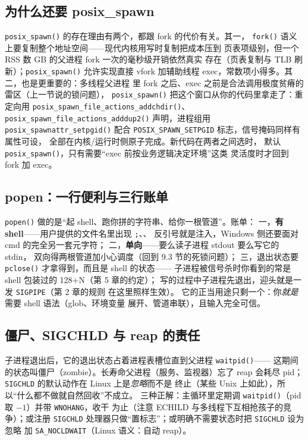 \documentclass[12pt,a4paper,fontset=fandol]{ctexbook}
\newcommand{\Fn}[1]{\texttt{#1()}}
\newcommand{\Tp}[1]{\texttt{#1}}
\begin{document}
\subsection{为什么还要 posix\_spawn}

\Fn{posix\_spawn} 的存在理由有两个，都跟 fork 的代价有关。其一，
\Fn{fork} 语义上要复制整个地址空间——现代内核用写时复制把成本压到
页表项级别，但一个 RSS 数 GB 的父进程 fork 一次的毫秒级开销依然真实
存在（页表复制与 TLB 刷新）；\Fn{posix\_spawn} 允许实现直接
vfork 加辅助线程 exec，常数项小得多。其二，也是更重要的：多线程父进程
里 fork 之后、exec 之前是合法调用极度贫瘠的雷区（上一节说的锁问题），
\Fn{posix\_spawn} 把这个窗口从你的代码里拿走了：重定向用
\Fn{posix\_\-spawn\_\-file\_\-actions\_\-addchdir}、
\Fn{posix\_\-spawn\_\-file\_\-actions\_\-adddup2} 声明，进程组用
\Fn{posix\_\-spawnattr\_\-setpgid} 配合
\Tp{POSIX\_\-SPAWN\_\-SETPGID} 标志，信号掩码同样有属性可设，
全部在内核/运行时侧原子完成。新代码在两者之间选时，
默认 \Fn{posix\_spawn}，只有需要``exec 前按业务逻辑决定环境''这类
灵活度时才回到 fork 加 exec。

\subsection{popen：一行便利与三行账单}

\Fn{popen} 做的是``起 shell、跑你拼的字符串、给你一根管道''。账单：
一，\textbf{有 shell}——用户提供的文件名里出现 \Tp{;}、\Tp{\textbar}、
反引号就是注入，Windows 侧还要面对 cmd 的完全另一套元字符；
二，\textbf{单向}——要么读子进程 stdout 要么写它的 stdin，
双向得两根管道加小心调度（回到 9.3 节的死锁问题）；
三，退出状态要 \Fn{pclose} 才拿得到，而且是 shell 的状态——
子进程被信号杀时你看到的常是 shell 包装过的 128+N（第 5 章的约定）；
写的过程中子进程先退出，迎头就是一发 \Tp{SIGPIPE}（第 2 章的规则
在这里照样生效）。
它的正当用途只剩一个：你\emph{就是}需要 shell 语法（glob、环境变量
展开、管道串联），且输入完全可信。

\subsection{僵尸、SIGCHLD 与 reap 的责任}

子进程退出后，它的退出状态占着进程表槽位直到父进程 \Fn{waitpid}——
这期间的状态叫僵尸（zombie）。长寿命父进程（服务、监视器）忘了 reap
会耗尽 pid；\Tp{SIGCHLD} 的默认动作在 Linux 上是\emph{忽略}而不是
终止（某些 Unix 上如此），所以``什么都不做就自然回收''不成立。
三种正解：主循环里定期调 \Fn{waitpid}（pid 取 $-1$）并带
\Tp{WNOHANG}，收干
为止（注意 ECHILD 与多线程下互相抢孩子的竞争）；或注册 \Tp{SIGCHLD}
处理器只做``置标志''；或明确不需要状态时把 \Tp{SIGCHLD} 设为忽略
加 \Tp{SA\_NOCLDWAIT}（Linux 语义：自动 reap）。
\end{document}
